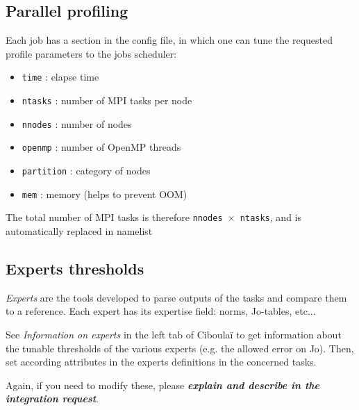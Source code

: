 \documentclass[a4paper,10pt,twoside]{article}
\begin{document}
\subsection{Parallel profiling}
Each job has a section in the config file, in which one can tune the requested profile parameters to the jobs scheduler:
\begin{itemize}
 \item \texttt{time} : elapse time
 \item \texttt{ntasks} : number of MPI tasks per node
 \item \texttt{nnodes} : number of nodes
 \item \texttt{openmp} : number of OpenMP threads
 \item \texttt{partition} : category of nodes
 \item \texttt{mem} : memory (helps to prevent OOM)
\end{itemize}
The total number of MPI tasks is therefore \texttt{nnodes $\times$ ntasks}, and is automatically replaced in namelist


\subsection{Experts thresholds}

\textit{Experts} are the tools developed to parse outputs of the tasks and compare them to a reference. Each expert has its expertise field: norms, Jo-tables, etc...

See \textit{Information on experts} in the left tab of Ciboulaï to get information about the tunable thresholds of the various experts (e.g. the allowed error on Jo).
Then, set according attributes in the experts definitions in the concerned tasks.

Again, if you need to modify these, please \textit{\textbf{explain and describe in the integration request}}.
\end{document}
